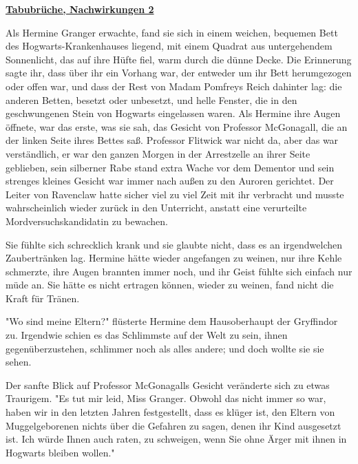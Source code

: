 

\hypertarget{tabubruxfcche-nachwirkungen-2}{%

\textbf{\uline{Tabubrüche, Nachwirkungen 2}}

Als Hermine Granger erwachte, fand sie sich in einem weichen, bequemen Bett des Hogwarts-Krankenhauses liegend, mit einem Quadrat aus untergehendem Sonnenlicht, das auf ihre Hüfte fiel, warm durch die dünne Decke. Die Erinnerung sagte ihr, dass über ihr ein Vorhang war, der entweder um ihr Bett herumgezogen oder offen war, und dass der Rest von Madam Pomfreys Reich dahinter lag: die anderen Betten, besetzt oder unbesetzt, und helle Fenster, die in den geschwungenen Stein von Hogwarts eingelassen waren. Als Hermine ihre Augen öffnete, war das erste, was sie sah, das Gesicht von Professor McGonagall, die an der linken Seite ihres Bettes saß. Professor Flitwick war nicht da, aber das war verständlich, er war den ganzen Morgen in der Arrestzelle an ihrer Seite geblieben, sein silberner Rabe stand extra Wache vor dem Dementor und sein strenges kleines Gesicht war immer nach außen zu den Auroren gerichtet. Der Leiter von Ravenclaw hatte sicher viel zu viel Zeit mit ihr verbracht und musste wahrscheinlich wieder zurück in den Unterricht, anstatt eine verurteilte Mordversuchskandidatin zu bewachen.

Sie fühlte sich schrecklich krank und sie glaubte nicht, dass es an irgendwelchen Zaubertränken lag. Hermine hätte wieder angefangen zu weinen, nur ihre Kehle schmerzte, ihre Augen brannten immer noch, und ihr Geist fühlte sich einfach nur müde an. Sie hätte es nicht ertragen können, wieder zu weinen, fand nicht die Kraft für Tränen.

"Wo sind meine Eltern?" flüsterte Hermine dem Hausoberhaupt der Gryffindor zu. Irgendwie schien es das Schlimmste auf der Welt zu sein, ihnen gegenüberzustehen, schlimmer noch als alles andere; und doch wollte sie sie sehen.

Der sanfte Blick auf Professor McGonagalls Gesicht veränderte sich zu etwas Traurigem. "Es tut mir leid, Miss Granger. Obwohl das nicht immer so war, haben wir in den letzten Jahren festgestellt, dass es klüger ist, den Eltern von Muggelgeborenen nichts über die Gefahren zu sagen, denen ihr Kind ausgesetzt ist. Ich würde Ihnen auch raten, zu schweigen, wenn Sie ohne Ärger mit ihnen in Hogwarts bleiben wollen."

}
